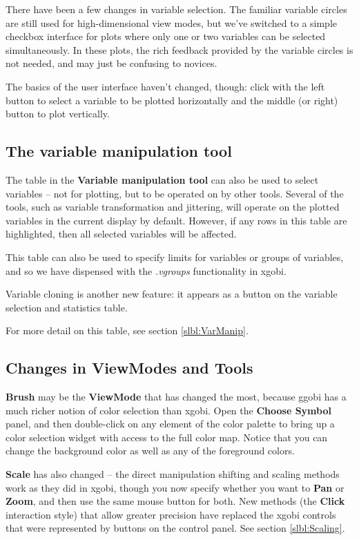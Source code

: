 \documentclass[11pt]{article}
\begin{document}
There have been a few changes in variable selection.  The
familiar variable circles are still used for high-dimensional
view modes, but we've switched to a simple checkbox interface
for plots where only one or two variables can be selected
simultaneously.  In these plots, the rich feedback provided
by the variable circles is not needed, and may just be confusing
to novices.

The basics of the user interface haven't changed, though:
click with the left button to select a variable to be plotted
horizontally and the middle (or right) button to plot vertically.

\subsection {The variable manipulation tool}

The table in the {\bf Variable manipulation tool} can also be used to
select variables -- not for plotting, but to be operated on by other
tools.  Several of the tools, such as variable transformation and
jittering, will operate on the plotted variables in the current
display by default.  However, if any rows in this table are
highlighted, then all selected variables will be affected.

This table can also be used to specify limits for variables or groups
of variables, and so we have dispensed with the {\em .vgroups}
functionality in xgobi.

Variable cloning is another new feature: it appears as a button
on the variable selection and statistics table.

For more detail on this table, see section \ref{slbl:VarManip}.

\subsection{Changes in ViewModes and Tools}

{\bf Brush} may be the {\bf ViewMode} that has changed the most,
because ggobi has a much richer notion of color selection than
xgobi.  Open the {\bf Choose Symbol} panel, and then double-click on
any element of the color palette to bring up a color selection widget
with access to the full color map.  Notice that you can change the
background color as well as any of the foreground colors.

{\bf Scale} has also changed -- the direct manipulation shifting and
scaling methods work as they did in xgobi, though you now specify
whether you want to {\bf Pan} or {\bf Zoom}, and then use the same
mouse button for both.  New methods (the {\bf Click} interaction
style) that allow greater precision have replaced the xgobi controls
that were represented by buttons on the control panel.  See section
\ref{slbl:Scaling}.
\end{document}
